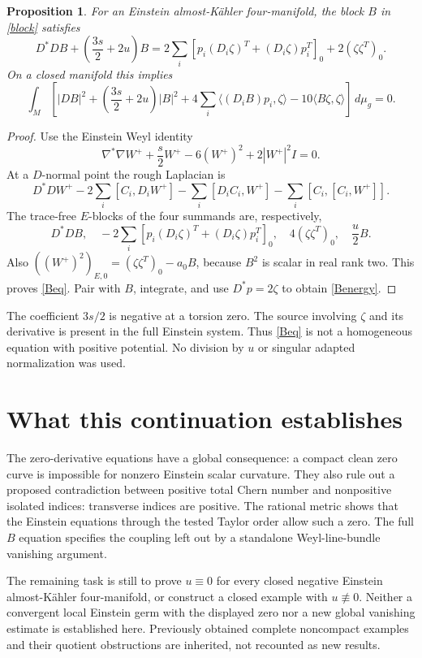 \documentclass[11pt]{article}
\newtheorem{proposition}{Proposition}
\newcommand{\vol}{\,d\mu_g}
\begin{document}
\begin{proposition}
For an Einstein almost-K\"ahler four-manifold, the block $B$ in \eqref{block} satisfies
\begin{equation}\label{Beq}
D^*DB+\left(\frac{3s}{2}+2u\right)B
=2\sum_i[p_i(D_i\zeta)^T+(D_i\zeta)p_i^T]_0
+2(\zeta\zeta^T)_0.
\end{equation}
On a closed manifold this implies
\begin{equation}\label{Benergy}
\int_M\left[|DB|^2+\left(\frac{3s}{2}+2u\right)|B|^2
+4\sum_i\langle(D_iB)p_i,\zeta\rangle
-10\langle B\zeta,\zeta\rangle\right]\vol=0.
\end{equation}
\end{proposition}
\begin{proof}
Use the Einstein Weyl identity \cite[equation (2), with $f=1$]{LeBrun}
\[
\nabla^*\nabla W^++\frac s2W^+-6(W^+)^2+2|W^+|^2I=0.
\]
At a $D$-normal point the rough Laplacian is
\[
D^*DW^+-2\sum_i[C_i,D_iW^+]
-\sum_i[D_iC_i,W^+]-\sum_i[C_i,[C_i,W^+]].
\]
The trace-free $E$-blocks of the four summands are, respectively,
\[
D^*DB,\quad-2\sum_i[p_i(D_i\zeta)^T+(D_i\zeta)p_i^T]_0,
\quad4(\zeta\zeta^T)_0,\quad\frac u2B.
\]
Also $((W^+)^2)_{E,0}=(\zeta\zeta^T)_0-a_0B$, because $B^2$ is scalar in real rank two. This proves \eqref{Beq}. Pair with $B$, integrate, and use $D^*p=2\zeta$ to obtain \eqref{Benergy}.
\end{proof}
The coefficient $3s/2$ is negative at a torsion zero. The source involving $\zeta$ and its derivative is present in the full Einstein system. Thus \eqref{Beq} is not a homogeneous equation with positive potential. No division by $u$ or singular adapted normalization was used.

\section{What this continuation establishes}
The zero-derivative equations have a global consequence: a compact clean zero curve is impossible for nonzero Einstein scalar curvature. They also rule out a proposed contradiction between positive total Chern number and nonpositive isolated indices: transverse indices are positive. The rational metric shows that the Einstein equations through the tested Taylor order allow such a zero. The full $B$ equation specifies the coupling left out by a standalone Weyl-line-bundle vanishing argument.

The remaining task is still to prove $u\equiv0$ for every closed negative Einstein almost-K\"ahler four-manifold, or construct a closed example with $u\not\equiv0$. Neither a convergent local Einstein germ with the displayed zero nor a new global vanishing estimate is established here. Previously obtained complete noncompact examples and their quotient obstructions are inherited, not recounted as new results.
\end{document}
